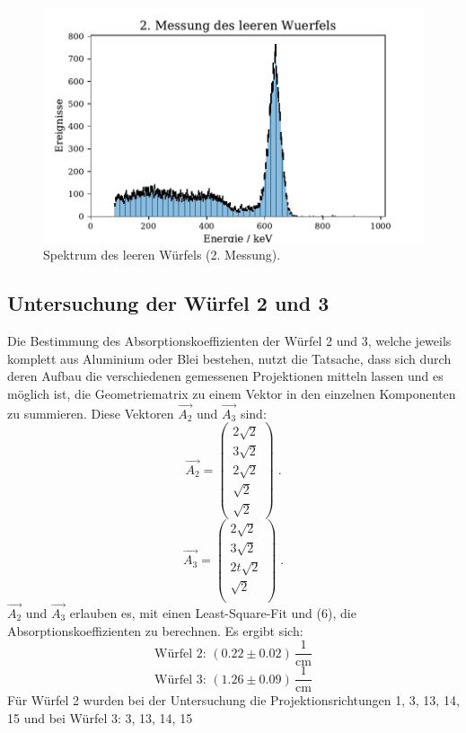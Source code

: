 \begin{figure}[H]
  \centering
  \includegraphics{plots/Alu_leer2.pdf}
  \caption{Spektrum des leeren Würfels (2. Messung).\cite{anleitung}}
  \label{Leermessung}
\end{figure}
\subsection{Untersuchung der Würfel 2 und 3}
Die Bestimmung des Absorptionskoeffizienten der Würfel 2 und 3, welche jeweils komplett aus Aluminium oder Blei bestehen, nutzt die Tatsache, dass sich durch deren Aufbau die verschiedenen gemessenen Projektionen mitteln lassen
und es möglich ist, die Geometriematrix zu einem Vektor in den einzelnen Komponenten zu summieren. Diese Vektoren $\vec{A_2}$ und $\vec{A_3}$ sind:
\begin{equation}
	\vec{A_2}=
	\begin{pmatrix}
		2\sqrt{2} \\
		3\sqrt{2} \\
		2\sqrt{2} \\
		\sqrt{2}\\
    \sqrt{2}
	\end{pmatrix} \; .
\end{equation}
\begin{equation}
	\vec{A_3}=
	\begin{pmatrix}
		2\sqrt{2} \\
		3\sqrt{2} \\
		2t\sqrt{2} \\
		\sqrt{2}\\
	\end{pmatrix} \; .
\end{equation}
$\vec{A_2}$ und $\vec{A_3}$ erlauben es, mit einen Least-Square-Fit und (6), die Absorptionskoeffizienten zu berechnen. Es ergibt sich:
\begin{equation}
  \text{Würfel 2: } \left(0.22 \pm 0.02\right) \, \frac{1}{\si{\centi\meter}} \nonumber
\end{equation}
\begin{equation}
  \text{Würfel 3: } \left(1.26 \pm 0.09\right) \, \frac{1}{\si{\centi\meter}} \nonumber
\end{equation}
Für Würfel 2 wurden bei der Untersuchung die Projektionsrichtungen 1, 3, 13, 14, 15 und bei Würfel 3: 3, 13, 14, 15
